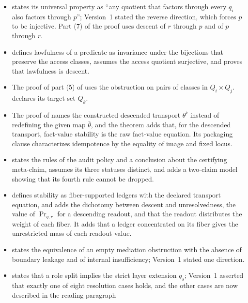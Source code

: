 \begin{itemize}
  in the orbit of the ground state that is not fixed by the group and is not
  the value of any equivariant selector. Its formation record is constant on orbits, so the identity map is not a record, and for a symmetric ground-state predicate the record exhibits two distinct ground states in one orbit.
\item {} states its universal property as ``any quotient that
  factors through every \(q_i\) also factors through \(p\)''; Version~1
  stated the reverse direction, which forces \(p\) to be injective. Part (7)
  of the proof uses descent of \(r\) through \(p\) and of \(p\) through \(r\).
\item {} defines lawfulness of a predicate as invariance under
  the bijections that preserve the access classes, assumes the access quotient
  surjective, and proves that lawfulness is descent.
\item The proof of part (5) of  uses the obstruction on pairs
  of classes in \(Q_i\times Q_j\).  declares its target set \(Q_k\).
\item The proof of  names the constructed descended transport
  \(\theta^{\flat}\) instead of redefining the given map \(\bar\theta\), and
  the theorem adds that, for the descended transport, fact-value stability is
  the raw fact-value equation. Its packaging clause characterizes idempotence by the equality of image and fixed locus.
\item {} states the rules of the audit policy and a conclusion
  about the certifying meta-claim, assumes its three statuses distinct, and
  adds a two-claim model showing that its fourth rule cannot be dropped.
\item {} defines stability as fiber-supported ledgers with the
  declared transport equation, and adds the dichotomy between descent and
  unresolvedness, the value of \(\operatorname{Pr}_{q,r}\) for a descending
  readout, and that the readout distributes the weight of each fiber. It adds that a ledger concentrated on its fiber gives the unrestricted mass of each readout value.
\item {} states the equivalence of an empty mediation obstruction
  with the absence of boundary leakage and of internal insufficiency; Version~1
  stated one direction.
\item {} states that a role split implies the strict layer
  extension \(q_s\); Version~1 asserted that exactly one of eight resolution
  cases holds, and the other cases are now described in the reading paragraph

\end{itemize}
